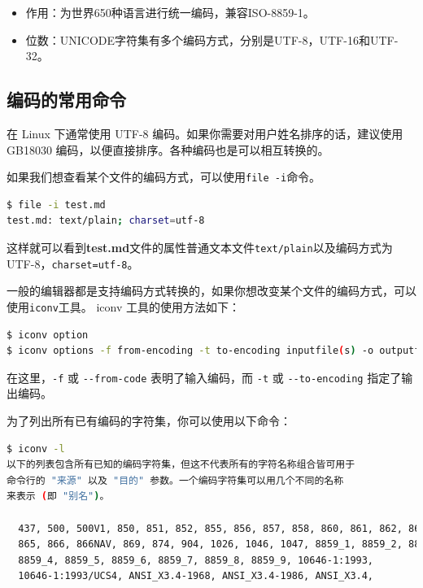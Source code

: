 \documentclass[doctor,openright,twoside]{sjtuthesis}
\providecommand{\tightlist}{%
    \setlength{\itemsep}{0pt}\setlength{\parskip}{0pt}}
\newcommand{\passthrough}[1]{#1}
\theoremstyle{plain}
\theoremstyle{definition}
\theoremstyle{remark}
\theoremstyle{ocrenumbox}
\theoremstyle{plain}
\begin{document}
\begin{itemize}
\tightlist
\item
  作用：为世界650种语言进行统一编码，兼容ISO-8859-1。
\item
  位数：UNICODE字符集有多个编码方式，分别是UTF-8，UTF-16和UTF-32。
\end{itemize}

\hypertarget{section-76}{%
\subsection{编码的常用命令}\label{section-76}}

在 Linux 下通常使用 UTF-8 编码。如果你需要对用户姓名排序的话，建议使用 GB18030 编码，以便直接排序。各种编码也是可以相互转换的。

如果我们想查看某个文件的编码方式，可以使用\passthrough{\lstinline!file -i!}命令。

\begin{lstlisting}[language=bash]
$ file -i test.md
test.md: text/plain; charset=utf-8
\end{lstlisting}

这样就可以看到\textbf{test.md}文件的属性普通文本文件\passthrough{\lstinline!text/plain!}以及编码方式为UTF-8，\passthrough{\lstinline!charset=utf-8!}。

一般的编辑器都是支持编码方式转换的，如果你想改变某个文件的编码方式，可以使用\passthrough{\lstinline!iconv!}工具。
iconv 工具的使用方法如下：

\begin{lstlisting}[language=bash]
$ iconv option
$ iconv options -f from-encoding -t to-encoding inputfile(s) -o outputfile 
\end{lstlisting}

在这里，\passthrough{\lstinline!-f!} 或 \passthrough{\lstinline!--from-code!} 表明了输入编码，而 \passthrough{\lstinline!-t!} 或 \passthrough{\lstinline!--to-encoding!} 指定了输出编码。

为了列出所有已有编码的字符集，你可以使用以下命令：

\begin{lstlisting}[language=bash]
$ iconv -l
以下的列表包含所有已知的编码字符集，但这不代表所有的字符名称组合皆可用于
命令行的 "来源" 以及 "目的" 参数。一个编码字符集可以用几个不同的名称
来表示 (即 "别名")。

  437, 500, 500V1, 850, 851, 852, 855, 856, 857, 858, 860, 861, 862, 863, 864,
  865, 866, 866NAV, 869, 874, 904, 1026, 1046, 1047, 8859_1, 8859_2, 8859_3,
  8859_4, 8859_5, 8859_6, 8859_7, 8859_8, 8859_9, 10646-1:1993,
  10646-1:1993/UCS4, ANSI_X3.4-1968, ANSI_X3.4-1986, ANSI_X3.4,
\end{lstlisting}
\end{document}
